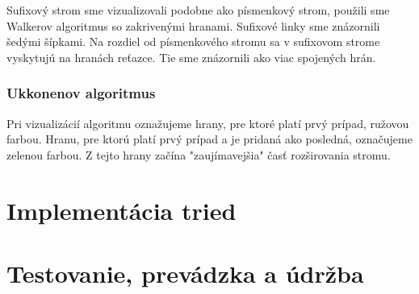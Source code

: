 Sufixový strom sme vizualizovali podobne ako písmenkový strom, použili sme 
Walkerov algoritmus \citep{walker} so zakrivenými hranami. Sufixové linky 
sme znázornili šedými šípkami. Na rozdiel od písmenkového stromu sa v 
sufixovom strome vyskytujú na hranách reťazce. Tie sme znázornili ako viac 
spojených hrán.

\subsubsection{Ukkonenov algoritmus}

Pri vizualizácií algoritmu oznažujeme hrany, pre ktoré platí prvý prípad, 
ružovou farbou. Hranu, pre ktorú platí prvý prípad a je pridaná ako posledná, 
označujeme zelenou farbou. Z tejto hrany začína "zaujímavejšia" časť 
rozširovania stromu.

\section{Implementácia tried}\label{sec:im:im}


\section{Testovanie, prevádzka a údržba}\label{sec:im:test}



